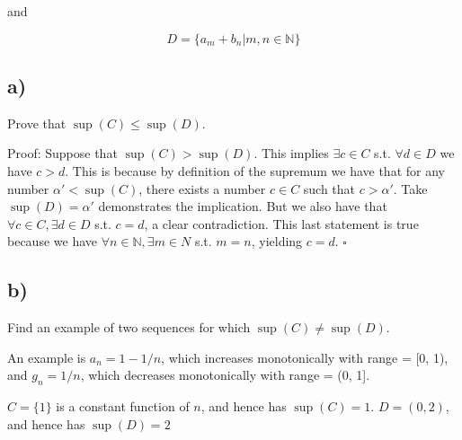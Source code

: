 \documentclass{article}
\newcommand{\N}{\mathbb{N}}
\begin{document}
and 

\begin{equation*}
  D = \{a_m + b_n|m, n \in \N\}
\end{equation*}

\subsection*{a)}

Prove that $\sup(C) \leq \sup(D)$. 

Proof: Suppose that $\sup(C) > \sup(D)$. 
This implies $\exists c \in C$ s.t. $\forall d \in D$ we have $c > d$. 
This is because by definition of the supremum we have that for any number $\alpha' < \sup(C)$, there exists a number $c \in C$ such that $c > \alpha'$. Take $\sup(D) = \alpha'$ demonstrates the implication.    
But we also have that $\forall c \in C, \exists d \in D$ s.t. $c = d$, a clear contradiction.
This last statement is true because we have $\forall n \in \N, \exists m \in N$ s.t. $m = n$, yielding $c = d$. $\square$

\subsection*{b)}

Find an example of two sequences for which $\sup(C) \neq \sup(D)$. 

An example is $a_n = 1 - 1/n$, which increases monotonically with range = [0, 1),
and $g_n = 1/n$, which decreases monotonically with range = (0, 1]. 

$C = \{1\}$ is a constant function of $n$, and hence has $\sup(C) = 1$. 
$D = (0, 2)$, and hence has $\sup(D) = 2$
\end{document}
